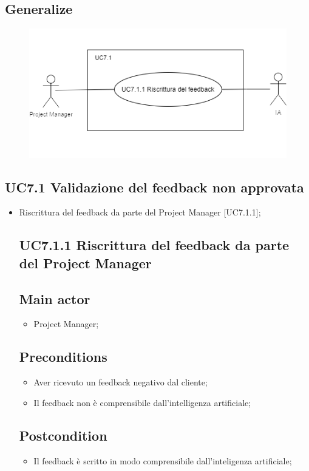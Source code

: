 \documentclass{article}
\begin{document}
    \subsection*{Generalize}
      \begin{figure}[h]
            \centering
            \includegraphics{documenti/imgUML/UC7-zoom1.png}
            \label{fig:immagine}
        \end{figure}
    \subsection{UC7.1 Validazione del feedback non approvata}
    \begin{itemize}
        \item Riscrittura del feedback da parte del Project Manager [UC7.1.1];
        \subsection*{UC7.1.1 Riscrittura del feedback da parte del Project Manager}
     \subsection*{Main actor}
         \begin{itemize}
             \item Project Manager;
         \end{itemize}
     \subsection*{Preconditions} 
        \begin{itemize}
            \item Aver ricevuto un feedback negativo dal cliente;
            \item Il feedback non è comprensibile dall'intelligenza artificiale;
        \end{itemize}
        \subsection*{Postcondition} 
        \begin{itemize}
            \item Il feedback è scritto in modo comprensibile dall'inteligenza artificiale;
        \end{itemize}
    \end{itemize}
    
\end{document}
